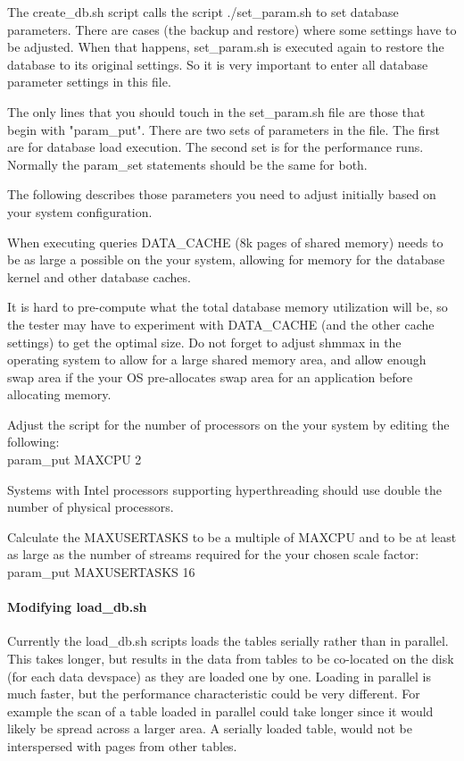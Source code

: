 \documentclass{article}
\begin{document}
\noindent
The create\_db.sh script calls the script ./set\_param.sh to set
database parameters.  There are cases (the backup and restore) where
some settings have to be adjusted.  When that happens, set\_param.sh
is executed again to restore the database to its original settings.
So it is very important to enter all database parameter settings in
this file.   

\noindent
The only lines that you should touch in the set\_param.sh file are
those that begin with "param\_put".  There are two sets of parameters
in the file.  The first are for database load execution.  The second
set is for the performance runs.  Normally the param\_set statements
should be the same for both.

\noindent
The following describes those parameters you need to adjust initially
based on your system configuration.

\noindent
When executing queries DATA\_CACHE  (8k pages of shared memory) needs
to be as large a possible on the your system, allowing for memory for
the database kernel and other database caches.  

\noindent
It is hard to pre-compute what the total database memory utilization
will be, so the tester may have to experiment with DATA\_CACHE (and
the other cache settings)  to get the optimal size.  Do not forget to
adjust shmmax in the operating system to allow for a large shared
memory area, and allow enough swap area if the your OS pre-allocates
swap area for an application before allocating memory.

\noindent
Adjust the script for the number of processors on the your system by
editing the following: \\
\indent param\_put MAXCPU 2

\noindent
Systems with Intel processors supporting hyperthreading should use
double the number of physical processors.

\noindent
Calculate the MAXUSERTASKS  to be a multiple of MAXCPU and to be at
least as large as the number of streams required for the your chosen
scale factor: \\
\indent param\_put MAXUSERTASKS 16

\paragraph{Modifying load\_db.sh}

\noindent
Currently the load\_db.sh scripts loads the tables serially rather
than in parallel.  This takes longer, but results in the data from
tables to be co-located on the disk (for each data devspace) as they
are loaded one by one.  Loading in parallel is much faster, but the
performance characteristic could be very different.  For example the
scan of a table loaded in parallel could take longer since it would
likely be spread across a larger area.  A serially loaded table,
would not be interspersed with pages from other tables.  
\end{document}
